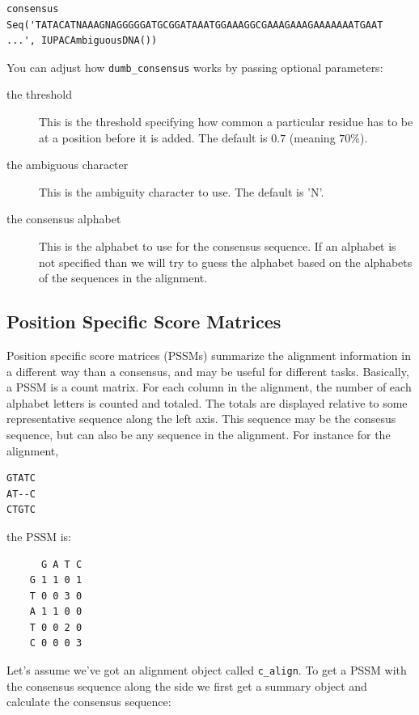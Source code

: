 \documentclass{report}
\begin{document}
\begin{verbatim}
consensus Seq('TATACATNAAAGNAGGGGGATGCGGATAAATGGAAAGGCGAAAGAAAGAAAAAAATGAAT
...', IUPACAmbiguousDNA())
\end{verbatim}

You can adjust how \verb|dumb_consensus| works by passing optional parameters:

\begin{description}
\item[the threshold] This is the threshold specifying how common a particular residue has to be at a position before it is added. The default is $0.7$ (meaning $70\%$).

\item[the ambiguous character] This is the ambiguity character to use. The default is 'N'.

\item[the consensus alphabet] This is the alphabet to use for the consensus sequence. If an alphabet is not specified than we will try to guess the alphabet based on the alphabets of the sequences in the alignment.
\end{description}

\subsection{Position Specific Score Matrices}
\label{sec:pssm}

Position specific score matrices (PSSMs) summarize the alignment information in a different way than a consensus, and may be useful for different tasks. Basically, a PSSM is a count matrix. For each column in the alignment, the number of each alphabet letters is counted and totaled. The totals are displayed relative to some representative sequence along the left axis. This sequence may be the consesus sequence, but can also be any sequence in the alignment. For instance for the alignment,

\begin{verbatim}
GTATC
AT--C
CTGTC
\end{verbatim}

\noindent the PSSM is:

\begin{verbatim}
      G A T C
    G 1 1 0 1
    T 0 0 3 0
    A 1 1 0 0
    T 0 0 2 0
    C 0 0 0 3
\end{verbatim}

Let's assume we've got an alignment object called \verb|c_align|. To get a PSSM with the consensus sequence along the side we first get a summary object and calculate the consensus sequence:
\end{document}
